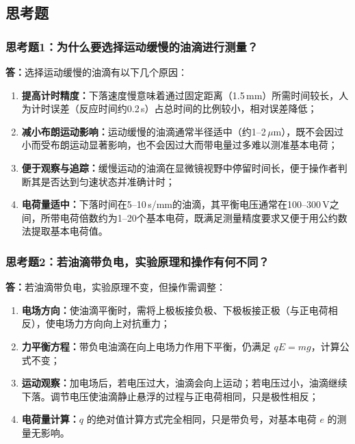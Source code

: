 \documentclass{Phyport}
\begin{document}
\subsection{思考题}

\subsubsection{思考题1：为什么要选择运动缓慢的油滴进行测量？}

\textbf{答：}选择运动缓慢的油滴有以下几个原因：

\begin{enumerate}
    \item \textbf{提高计时精度：}下落速度慢意味着通过固定距离（1.5\,mm）所需时间较长，人为计时误差（反应时间约0.2\,s）占总时间的比例较小，相对误差降低；
    \item \textbf{减小布朗运动影响：}运动缓慢的油滴通常半径适中（约1--2\,$\mu$m），既不会因过小而受布朗运动显著影响，也不会因过大而带电量过多难以测准基本电荷；
    \item \textbf{便于观察与追踪：}缓慢运动的油滴在显微镜视野中停留时间长，便于操作者判断其是否达到匀速状态并准确计时；
    \item \textbf{电荷量适中：}下落时间在5--10\,s/mm的油滴，其平衡电压通常在100--300\,V之间，所带电荷倍数约为1--20个基本电荷，既满足测量精度要求又便于用公约数法提取基本电荷值。
\end{enumerate}

\subsubsection{思考题2：若油滴带负电，实验原理和操作有何不同？}

\textbf{答：}若油滴带负电，实验原理不变，但操作需调整：

\begin{enumerate}
    \item \textbf{电场方向：}使油滴平衡时，需将上极板接负极、下极板接正极（与正电荷相反），使电场力方向向上对抗重力；
    \item \textbf{力平衡方程：}带负电油滴在向上电场力作用下平衡，仍满足 $qE = mg$，计算公式不变；
    \item \textbf{运动观察：}加电场后，若电压过大，油滴会向上运动；若电压过小，油滴继续下落。调节电压使油滴静止悬浮的过程与正电荷相同，只是极性相反；
    \item \textbf{电荷量计算：}$q$ 的绝对值计算方式完全相同，只是带负号，对基本电荷 $e$ 的测量无影响。
\end{enumerate}
\end{document}

